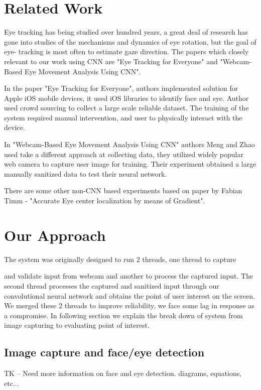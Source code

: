 \documentclass[10pt,twocolumn,letterpaper]{article}
\begin{document}
\section{Related Work}
Eye tracking has being studied over hundred years, a great deal of research has gone into studies of the mechanisms and dynamics of eye rotation, but the goal of eye- tracking is most often to estimate gaze direction.  The papers which closely relevant to our work using CNN are "Eye Tracking for Everyone"\cite{krafka} and "Webcam-Based Eye Movement Analysis Using CNN"\cite{zhaomeng}.

In the paper "Eye Tracking for Everyone", authors implemented solution for Apple iOS mobile devices, it used iOS libraries to identify face and eye. Author used crowd sourcing to collect a large scale reliable dataset. The training of the system required manual intervention, and user to physically interact with the device. 

In "Webcam-Based Eye Movement Analysis Using CNN" authors Meng and Zhao used take a different approach at collecting data, they utilized widely popular web camera to capture user image for training. Their experiment obtained a large manually sanitized data to test their neural network. 

There are some other non-CNN based experiments based on paper by Fabian Timm - "Accurate Eye center localization by means of Gradient". 

\section{Our Approach}
The system was originally  designed to run 2 threads, one thread to capture 


and validate input from webcam and another to process the 
captured input. The second thread processes the captured and 
sanitized input through our convolutional neural network and 
obtains the point of user interest on the screen. We merged these 2 threads to improve reliability, we face some lag in response as a compromise. In following section we explain the break down of system from image capturing  to evaluating point of interest.  



\subsection{Image capture and face/eye detection}
TK -- Need more information on face and eye detection. diagrams,
equations, etc...
\end{document}
